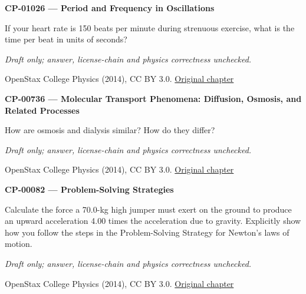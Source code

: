 \par\medskip
\noindent\textbf{CP-01026 — Period and Frequency in Oscillations}
\par If your heart rate is 150 beats per minute during strenuous exercise, what is the time per beat in units of seconds?
\par\smallskip
\textit{Draft only; answer, license-chain and physics correctness unchecked.}
\par{\footnotesize OpenStax College Physics (2014), CC BY 3.0. \href{https://github.com/philschatz/physics-book/blob/a7efaa7e221fab1694022d8bb98b83a73ee31d3d/contents/m42241.md}{Original chapter}}\par\normalsize

\par\medskip
\noindent\textbf{CP-00736 — Molecular Transport Phenomena: Diffusion, Osmosis, and Related Processes}
\par How are osmosis and dialysis similar? How do they differ?
\par\smallskip
\textit{Draft only; answer, license-chain and physics correctness unchecked.}
\par{\footnotesize OpenStax College Physics (2014), CC BY 3.0. \href{https://github.com/philschatz/physics-book/blob/a7efaa7e221fab1694022d8bb98b83a73ee31d3d/contents/m42212.md}{Original chapter}}\par\normalsize

\par\medskip
\noindent\textbf{CP-00082 — Problem-Solving Strategies}
\par Calculate the force a 70.0-kg high jumper must exert on the ground to produce an upward acceleration 4.00 times the acceleration due to gravity. Explicitly show how you follow the steps in the Problem-Solving Strategy for Newton’s laws of motion.
\par\smallskip
\textit{Draft only; answer, license-chain and physics correctness unchecked.}
\par{\footnotesize OpenStax College Physics (2014), CC BY 3.0. \href{https://github.com/philschatz/physics-book/blob/a7efaa7e221fab1694022d8bb98b83a73ee31d3d/contents/m42076.md}{Original chapter}}\par\normalsize

